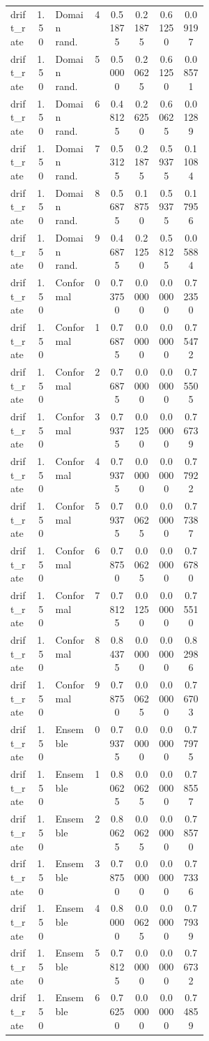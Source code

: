 \documentclass{article}
\begin{document}
\begin{center}
\begin{longtable}{p{0.13\linewidth}cp{0.20\linewidth}ccccc}
drift\_rate & 1.50 & Domain rand. & 4 & 0.51875 & 0.21875 & 0.61250 & 0.09197\\
drift\_rate & 1.50 & Domain rand. & 5 & 0.50000 & 0.20625 & 0.61250 & 0.08571\\
drift\_rate & 1.50 & Domain rand. & 6 & 0.48125 & 0.26250 & 0.60625 & 0.01289\\
drift\_rate & 1.50 & Domain rand. & 7 & 0.53125 & 0.21875 & 0.59375 & 0.11084\\
drift\_rate & 1.50 & Domain rand. & 8 & 0.56875 & 0.18750 & 0.59375 & 0.17956\\
drift\_rate & 1.50 & Domain rand. & 9 & 0.46875 & 0.21250 & 0.58125 & 0.05884\\
drift\_rate & 1.50 & Conformal & 0 & 0.73750 & 0.00000 & 0.00000 & 0.72350\\
drift\_rate & 1.50 & Conformal & 1 & 0.76875 & 0.00000 & 0.00000 & 0.75472\\
drift\_rate & 1.50 & Conformal & 2 & 0.76875 & 0.00000 & 0.00000 & 0.75505\\
drift\_rate & 1.50 & Conformal & 3 & 0.79375 & 0.01250 & 0.00000 & 0.76739\\
drift\_rate & 1.50 & Conformal & 4 & 0.79375 & 0.00000 & 0.00000 & 0.77922\\
drift\_rate & 1.50 & Conformal & 5 & 0.79375 & 0.00625 & 0.00000 & 0.77387\\
drift\_rate & 1.50 & Conformal & 6 & 0.78750 & 0.00625 & 0.00000 & 0.76780\\
drift\_rate & 1.50 & Conformal & 7 & 0.78125 & 0.01250 & 0.00000 & 0.75510\\
drift\_rate & 1.50 & Conformal & 8 & 0.84375 & 0.00000 & 0.00000 & 0.82986\\
drift\_rate & 1.50 & Conformal & 9 & 0.78750 & 0.00625 & 0.00000 & 0.76703\\
drift\_rate & 1.50 & Ensemble & 0 & 0.79375 & 0.00000 & 0.00000 & 0.77975\\
drift\_rate & 1.50 & Ensemble & 1 & 0.80625 & 0.00625 & 0.00000 & 0.78557\\
drift\_rate & 1.50 & Ensemble & 2 & 0.80625 & 0.00625 & 0.00000 & 0.78570\\
drift\_rate & 1.50 & Ensemble & 3 & 0.78750 & 0.00000 & 0.00000 & 0.77336\\
drift\_rate & 1.50 & Ensemble & 4 & 0.80000 & 0.00625 & 0.00000 & 0.77939\\
drift\_rate & 1.50 & Ensemble & 5 & 0.78125 & 0.00000 & 0.00000 & 0.76732\\
drift\_rate & 1.50 & Ensemble & 6 & 0.76250 & 0.00000 & 0.00000 & 0.74859\\

\end{longtable}
\end{center}
\end{document}
